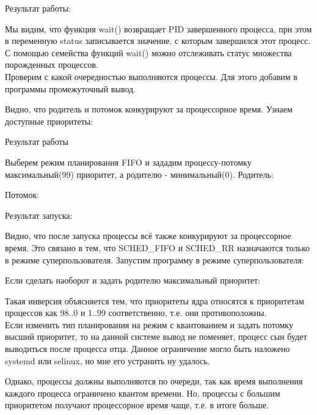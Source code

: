 \documentclass[a4paper]{article}
\begin{document}
	Результат работы:
	
	
	Мы видим, что функция wait() возвращает PID завершенного процесса, при этом в переменную status записывается значение, с которым завершился этот процесс. С помощью семейства функций wait() можно отслеживать статус множества порожденных процессов.\\
	
	Проверим с какой очередностью выполняются процессы. Для этого добавим в программы промежуточный вывод.
	
	
	
	Видно, что родитель и потомок конкурируют за процессорное время. Узнаем доступные приоритеты:
	
	Результат работы
	
	
	
	Выберем режим планирования FIFO и зададим процессу-потомку максимальный(99) приоритет, а родителю - минимальный(0).
	Родитель:
	

	Потомок:
	

	
	Результат запуска:
	
		
	Видно, что после запуска процессы всё также конкурируют за процессорное время. Это связано в тем, что  SCHED\_FIFO и SCHED\_RR назначаются только в режиме суперпользователя. Запустим программу в режиме суперпользователя:
	
	
	Если сделать наоборот и задать родителю максимальный приоритет:
	
	Такая инверсия объясняется тем, что приоритеты ядра относятся к приоритетам процессов как 98..0 и 1..99 соответственно, т.е. они противоположны.\\

	
	Если изменить тип планирования на режим с квантованием и задать потомку высший приоритет, то на данной системе вывод не поменяет, процесс сын будет выводиться после процесса отца. Данное ограничение могло быть наложено systemd или selinux,	но мне его устранить ну удалось.
	
	Однако, процессы должны выполняются по очереди, так как время выполнения каждого процесса ограничено квантом времени. Но, процессы с большим приоритетом получают процессорное время чаще, т.е. в итоге больше.
	
\end{document}
